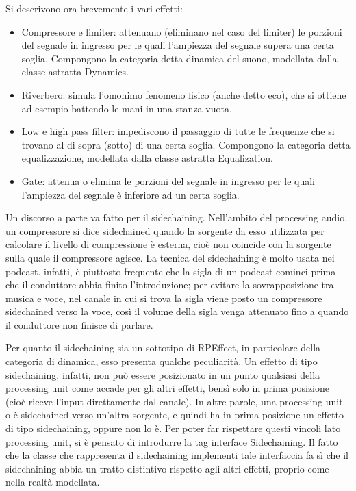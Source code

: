 \documentclass[a4paper,12pt]{report}
\begin{document}
Si descrivono ora brevemente i vari effetti:
\begin{itemize}
    \item Compressore e limiter: attenuano (eliminano nel caso del limiter) le porzioni del segnale in ingresso per le quali l’ampiezza del segnale supera una certa soglia. Compongono la categoria detta dinamica del suono, modellata dalla classe astratta Dynamics.
    \item Riverbero: simula l’omonimo fenomeno fisico (anche detto eco), che si ottiene ad esempio battendo le mani in una stanza vuota.
    \item Low e high pass filter: impediscono il passaggio di tutte le frequenze che si trovano al di sopra (sotto) di una certa soglia. Compongono la categoria detta equalizzazione, modellata dalla classe astratta Equalization.
    \item Gate: attenua o elimina le porzioni del segnale in ingresso per le quali l’ampiezza del segnale è inferiore ad un certa soglia.
\end{itemize}
Un discorso a parte va fatto per il sidechaining. Nell’ambito del processing audio, un compressore si dice sidechained quando la sorgente da esso utilizzata per calcolare il livello di compressione è esterna, cioè non coincide con la sorgente sulla quale il compressore agisce. La tecnica del sidechaining è molto usata nei podcast. infatti, è piuttosto frequente che la sigla di un podcast cominci prima che il conduttore abbia finito l’introduzione; per evitare la sovrapposizione tra musica e voce, nel canale in cui si trova la sigla viene posto un compressore sidechained verso la voce, così il volume della sigla venga attenuato fino a quando il conduttore non finisce di parlare. 

Per quanto il sidechaining sia un sottotipo di RPEffect, in particolare della categoria di dinamica, esso presenta qualche peculiarità. Un effetto di tipo sidechaining, infatti, non può essere posizionato in un punto qualsiasi della processing unit come accade per gli altri effetti, bensì solo in prima posizione (cioè riceve l’input direttamente dal canale). In altre parole, una processing unit o è sidechained verso un’altra sorgente, e quindi ha in prima posizione un effetto di tipo sidechaining, oppure non lo è. Per poter far rispettare questi vincoli lato processing unit, si è pensato di introdurre la tag interface Sidechaining. Il fatto che la classe che rappresenta il sidechaining implementi tale interfaccia fa sì che il sidechaining abbia un tratto distintivo rispetto agli altri effetti, proprio come nella realtà modellata.
\end{document}
